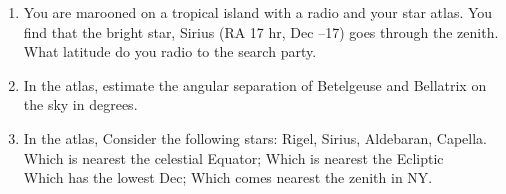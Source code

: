 \begin{enumerate}
\item You are marooned on a tropical island with a radio and your star
  atlas. You find that the bright star, Sirius (RA 17 hr, Dec
--17\deg) goes through the zenith. What latitude do you radio to
the search party.

\item
In the atlas, estimate the angular separation of Betelgeuse and
Bellatrix on the sky in degrees.


\item In the atlas, Consider the following stars:  
Rigel, Sirius, Aldebaran, Capella.
\\  Which is nearest the celestial Equator;
Which is nearest the Ecliptic \\ 
Which has the lowest Dec;
Which comes nearest the zenith in NY.


\end{enumerate} 













